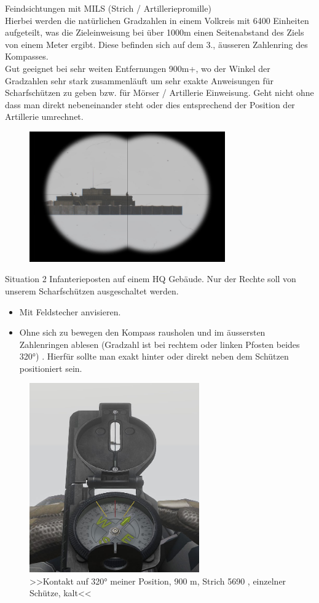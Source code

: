 Feindsichtungen mit MILS (Strich / Artilleriepromille) \\

Hierbei werden die natürlichen Gradzahlen in einem Volkreis mit 6400 Einheiten aufgeteilt, was die Zieleinweisung bei über 1000m einen Seitenabstand des Ziels von einem Meter ergibt. Diese befinden sich auf dem 3., äusseren Zahlenring des Kompasses.\\
Gut geeignet bei sehr weiten Entfernungen 900m+, wo der Winkel der Gradzahlen sehr stark zusammenläuft um sehr exakte Anweisungen für Scharfschützen zu geben bzw. für Mörser / Artillerie Einweisung. Geht nicht ohne dass man direkt nebeneinander steht oder dies entsprechend der Position der Artillerie umrechnet.  \\

\begin{figure}[!h]
	\centering
	\includegraphics[width=0.75\textwidth]{../img/advanced/kartenarbeit/kompass5}
\end{figure}
Situation 2 Infanterieposten auf einem HQ Gebäude. Nur der Rechte soll von unserem Scharfschützen ausgeschaltet werden.\\
\begin{itemize}
 	\item Mit Feldstecher anvisieren.
	\item Ohne sich zu bewegen den Kompass rausholen und im äussersten Zahlenringen ablesen (Gradzahl ist bei rechtem oder linken Pfosten beides 320°) . Hierfür sollte man exakt hinter oder direkt neben dem Schützen positioniert sein.
	\end{itemize}
\begin{figure}[!h]
	\centering
	\includegraphics[width=0.65\textwidth]{../img/advanced/kartenarbeit/kompass6}
	\caption{>>Kontakt auf 320° meiner Position, 900 m, Strich 5690 , einzelner Schütze, kalt<<}
\end{figure}
